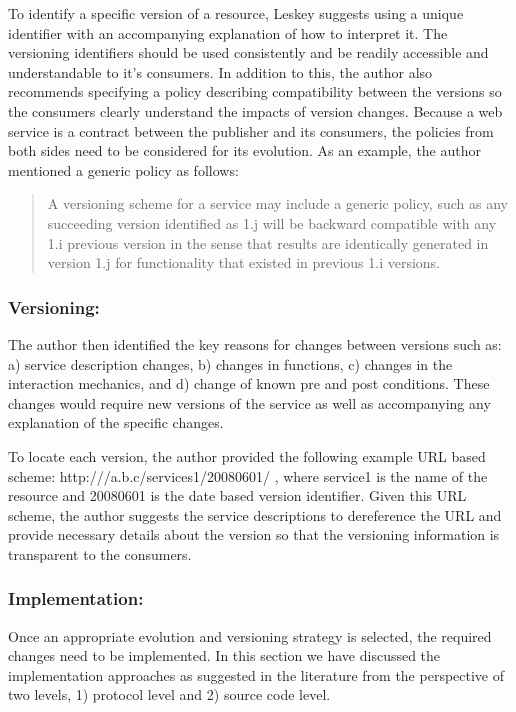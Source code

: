 \documentclass[runningheads,a4paper]{llncs}
\begin{document}
To identify a specific version of a resource, Leskey suggests using a unique identifier with an accompanying explanation of how to interpret it. The versioning identifiers should be used consistently and be readily accessible and understandable to it’s consumers. In addition to this, the author also recommends specifying a policy describing compatibility between the versions so the consumers clearly understand the impacts of version changes. Because a web service is a contract between the publisher and its consumers, the policies from both sides need to be considered for its evolution. As an example, the author mentioned a generic policy as follows:

\begin{quote}
  A versioning scheme for a service may include a generic policy, such as any succeeding version identified as 1.j will be backward compatible with any 1.i previous version in the sense that results are identically generated in version 1.j for functionality that existed in previous 1.i versions.
\end{quote}

\subsubsection{Versioning:}
The author then identified the key reasons for changes between versions such as: a) service description changes, b) changes in functions, c) changes in the interaction mechanics, and d) change of known pre and post conditions. These changes would require new versions of the service as well as accompanying any explanation of the specific changes.

To locate each version, the author provided the following example URL based scheme: http:///a.b.c/services1/20080601/ , where service1 is the name of the resource and 20080601 is the date based version identifier. Given this URL scheme, the author suggests the service descriptions to dereference the URL and provide necessary details about the version so that the versioning information is transparent to the consumers.

\subsubsection{Implementation:}
Once an appropriate evolution and versioning strategy is selected, the required changes need to be implemented. In this section we have discussed the implementation approaches as suggested in the literature from the perspective of two levels, 1) protocol level and 2) source code level.
\end{document}
